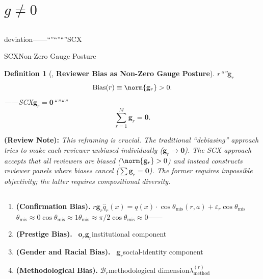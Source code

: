 \documentclass[12pt,a4paper]{article}
\newtheorem{definition}[theorem]{Definition}
\theoremstyle{remark}
\newcommand{\gaugeVec}{\mathbf{g}}
\newcommand{\misalignAngle}{\theta_{\text{mis}}}
\newcommand{\reviewnote}[1]{%
    \medskip\noindent
    \textbf{ (Review Note):} \textit{#1}%
}
\begin{document}
\section{$g \neq 0$}
\label{sec:reviewer_bias}

\subsection{}

\textbf{}deviation——``''``''\textbf{}``''SCX

SCX\textbf{}Non-Zero Gauge Posture

\begin{definition}[, \textbf{Reviewer Bias as Non-Zero Gauge Posture}]
\label{def:bias_as_gauge}
$r$\textbf{}``''$\gaugeVec_r$\textbf{}
\begin{equation}
    \text{Bias}(r) \equiv \norm{\gaugeVec_r} > 0.
    \label{eq:bias_gauge}
\end{equation}
\textbf{}——SCX$\gaugeVec_r = \mathbf{0}$``''``''
\begin{equation}
    \sum_{r=1}^{M} \gaugeVec_r = \mathbf{0}.
    \label{eq:bias_cancellation}
\end{equation}
\end{definition}

\reviewnote{This reframing is crucial. The traditional ``debiasing'' approach tries to make each reviewer unbiased individually ($\gaugeVec_r \to \mathbf{0}$). The SCX approach accepts that all reviewers are biased ($\norm{\gaugeVec_r} > 0$) and instead constructs reviewer panels where biases cancel ($\sum \gaugeVec_r = \mathbf{0}$). The former requires impossible objectivity; the latter requires compositional diversity.}

\subsection{}



\begin{enumerate}[label=(\arabic*), leftmargin=*]
    \item \textbf{ (Confirmation Bias).} $r$$\gaugeVec_r$$\hat{q}_r(x) = q(x) \cdot \cos\misalignAngle(r, a) + \varepsilon_r$$\cos\misalignAngle$$\misalignAngle \approx 0$$\cos\misalignAngle \approx 1$$\misalignAngle \approx \pi/2$$\cos\misalignAngle \approx 0$——
    
    \item \textbf{ (Prestige Bias).} ~\cite{blank1991effects}$\mathbf{o}_r$$\gaugeVec_r$\textbf{}institutional component
    
    \item \textbf{ (Gender and Racial Bias).} ~\cite{wenneras1997nepotism}$\gaugeVec_r$\textbf{}social-identity component
    
    \item \textbf{ (Methodological Bias).} $\mathcal{B}_r$\textbf{}methodological dimension$\lambda_{\text{method}}^{(r)}$\textit{}\textit{}
\end{enumerate}
\end{document}
